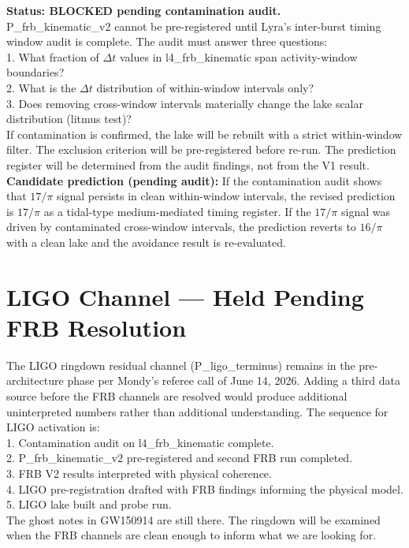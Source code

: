 \documentclass[11pt, letterpaper, openany]{book}
\begin{document}
\begin{warningbox}
\textbf{Status: BLOCKED pending contamination audit.}\\[0.5em]
P\_frb\_kinematic\_v2 cannot be pre-registered until Lyra's inter-burst
timing window audit is complete. The audit must answer three questions:\\[0.5em]
1. What fraction of $\Delta t$ values in l4\_frb\_kinematic span
activity-window boundaries?\\
2. What is the $\Delta t$ distribution of within-window intervals only?\\
3. Does removing cross-window intervals materially change the lake
scalar distribution (litmus test)?\\[0.5em]
If contamination is confirmed, the lake will be rebuilt with a strict
within-window filter. The exclusion criterion will be pre-registered
before re-run. The prediction register will be determined from the
audit findings, not from the V1 result.\\[0.5em]
\textbf{Candidate prediction (pending audit):} If the contamination audit
shows that $17/\pi$ signal persists in clean within-window intervals,
the revised prediction is $17/\pi$ as a tidal-type medium-mediated
timing register. If the $17/\pi$ signal was driven by contaminated
cross-window intervals, the prediction reverts to $16/\pi$ with a
clean lake and the avoidance result is re-evaluated.
\end{warningbox}

\section*{LIGO Channel --- Held Pending FRB Resolution}

\begin{warningbox}
The LIGO ringdown residual channel (P\_ligo\_terminus) remains in the
pre-architecture phase per Mondy's referee call of June 14, 2026.
Adding a third data source before the FRB channels are resolved would
produce additional uninterpreted numbers rather than additional
understanding. The sequence for LIGO activation is:\\[0.5em]
1. Contamination audit on l4\_frb\_kinematic complete.\\
2. P\_frb\_kinematic\_v2 pre-registered and second FRB run completed.\\
3. FRB V2 results interpreted with physical coherence.\\
4. LIGO pre-registration drafted with FRB findings informing the
   physical model.\\
5. LIGO lake built and probe run.\\[0.5em]
The ghost notes in GW150914 are still there. The ringdown will be
examined when the FRB channels are clean enough to inform what
we are looking for.
\end{warningbox}
\end{document}

